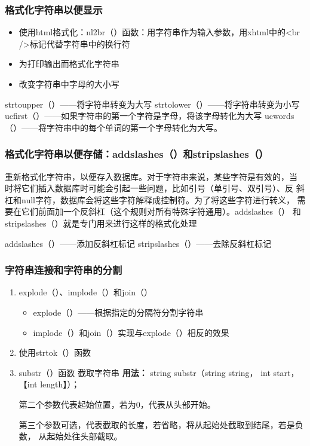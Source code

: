 \documentclass[11pt]{article}
\begin{document}
\subsubsection{格式化字符串以便显示}
\label{sec:org6f71d12}
\begin{itemize}
\item 使用html格式化：nl2br（）函数：用字符串作为输入参数，用xhtml中的<br
/>标记代替字符串中的换行符
\item 为打印输出而格式化字符串
\item 改变字符串中字母的大小写
\end{itemize}
strtoupper（）——将字符串转变为大写
strtolower（）——将字符串转变为小写
ucfirst（）——如果字符串的第一个字符是字母，将该字母转化为大写
ucwords（）——将字符串中的每个单词的第一个字母转化为大写。
\subsubsection{格式化字符串以便存储：addslashes（）和stripslashes（）}
\label{sec:orgcd510df}
重新格式化字符串，以便存入数据库。对于字符串来说，某些字符是有效的，当
时将它们插入数据库时可能会引起一些问题，比如引号（单引号、双引号）、反
斜杠和null字符，数据库会将这些字符解释成控制符。为了将这些字符进行转义，
需要在它们前面加一个反斜杠（这个规则对所有特殊字符通用）。addslashes（）
和stripslashes（）就是专门用来进行这样的格式化处理

addslashes（）——添加反斜杠标记
stripslashes（）——去除反斜杠标记
\subsubsection{字符串连接和字符串的分割}
\label{sec:orgb4c37ce}
\begin{enumerate}
\item explode（）、implode（）和join（）
\label{sec:org9ba2bdc}
\begin{itemize}
\item explode（）——根据指定的分隔符分割字符串
\item implode（）和join（）实现与explode（）相反的效果
\end{itemize}
\item 使用strtok（）函数
\label{sec:org4cdb975}
\item substr（）函数
\label{sec:orgc29ea7a}
截取字符串
\textbf{用法：}
string substr（string string， int start，【int length】）；

第二个参数代表起始位置，若为0，代表从头部开始。

第三个参数可选，代表截取的长度，若省略，将从起始处截取到结尾，若是负数，
从起始处往头部截取。
\end{enumerate}
\end{document}
